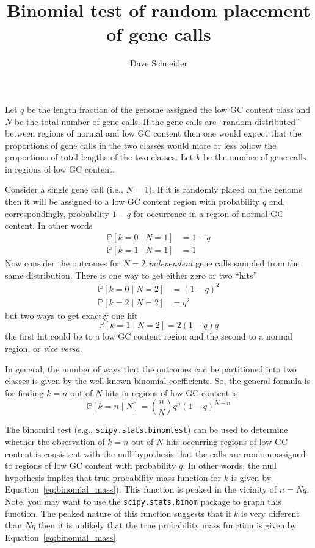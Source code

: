 \documentclass[12pt]{article}
\title{Binomial test of random placement\\
  of gene calls}
\author{Dave Schneider}
\renewcommand{\Pr}[1]{\ensuremath{\mathbb{P}\left[#1\right]}}
\begin{document}
\maketitle

Let $q$ be the length fraction of the genome assigned the low GC
content class and $N$ be the total number of gene calls.  If the gene
calls are ``random distributed'' between regions of normal and low GC
content then one would expect that the proportions of gene calls in
the two classes would more or less follow the proportions of total
lengths of the two classes.  Let $k$ be the number of gene calls in
regions of low GC content.

Consider a single gene call (i.e., $N=1$).  If it is randomly placed
on the genome then it will be assigned to a low GC content region with
probability $q$ and, correspondingly, probability $1-q$ for occurrence in a region of normal GC content.  In other words
\begin{align}
  \Pr{k=0\mid N=1} & = 1 - q \\
  \Pr{k=1\mid N=1} & = 1  
\end{align}
Now consider the outcomes for $N=2$ \emph{independent} gene calls
sampled from the same distribution.  There is one way to get either
zero or two ``hits''
\begin{align}
  \Pr{k=0\mid N=2} & = \left(1 - q\right)^2 \\
  \Pr{k=2\mid N=2} & = q^2
\end{align}
but two ways to get exactly one hit
\begin{equation}
  \Pr{k=1\mid N=2} = 2\left(1-q\right)q 
\end{equation}
the first hit could be to a low GC content region and the second to a
normal region, or \emph{vice versa}.

In general, the number of ways that the outcomes can be partitioned
into two classes is given by the well known binomial coefficients.
So, the general formula is for finding $k=n$ out of $N$ hits in
regions of low GC content is
\begin{equation}
  \Pr{k=n \mid N} = \binom{n}{N} q^{n}\left(1-q\right)^{N-n}
  \label{eq:binomial_mass}
\end{equation}

The binomial test (e.g., \texttt{scipy.stats.binomtest}) can be used
to determine whether the observation of $k=n$ out of $N$ hits
occurring regions of low GC content is consistent with the null
hypothesis that the calls are random assigned to regions of low GC
content with probability $q$.  In other words, the null hypothesis
implies that true probability mass function for $k$ is given by
Equation~\ref{eq:binomial_mass}). This function is peaked in the
vicinity of $n=Nq$.  Note, you may want to use the
\texttt{scipy.stats.binom} package to graph this function.  The peaked
nature of this function suggests that if $k$ is very different than
$Nq$ then it is unlikely that the true probability mass function is
given by Equation~\ref{eq:binomial_mass}.
\end{document}
